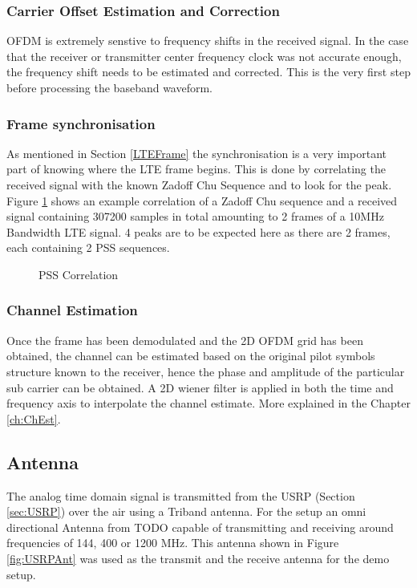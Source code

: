 \subsubsection{Carrier Offset Estimation and Correction}
OFDM is extremely senstive to frequency shifts in the received signal. In the case that the receiver or transmitter center frequency clock was not accurate enough, the frequency shift needs to be estimated and corrected. This is the very first step before processing the baseband waveform.


\subsubsection{Frame synchronisation}
As mentioned in Section \ref{LTEFrame} the synchronisation is a very important part of knowing where the LTE frame begins. This is done by correlating the received signal with the known Zadoff Chu Sequence and to look for the peak. Figure \ref{fig:PSSCorr} shows an example correlation of a Zadoff Chu sequence and a received signal containing 307200 samples in total amounting to 2 frames of a 10MHz Bandwidth LTE signal. 4 peaks are to be expected here as there are 2 frames, each containing 2 PSS sequences.

\begin{figure}[H]
    \begin{center}
        \caption{PSS Correlation}
        \label{fig:PSSCorr}
    \end{center}
\end{figure}

\subsubsection{Channel Estimation}

Once the frame has been demodulated and the 2D OFDM grid has been obtained, the channel can be estimated based on the original pilot symbols structure known to the receiver, hence the phase and amplitude of the particular sub carrier can be obtained. A 2D wiener filter is applied in both the time and frequency axis to interpolate the channel estimate. More explained in the Chapter \ref{ch:ChEst}.


\subsection{Antenna}
The analog time domain signal is transmitted from the USRP (Section \ref{sec:USRP}) over the air using a Triband antenna. For the setup an omni directional Antenna from TODO capable of transmitting and receiving around frequencies of 144, 400 or 1200 MHz. This antenna shown in Figure \ref{fig:USRPAnt} was used as the transmit and the receive antenna for the demo setup.

